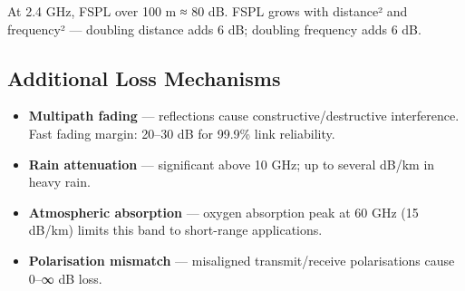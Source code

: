 At 2.4 GHz, FSPL over 100 m ≈ 80 dB. FSPL grows with distance² and frequency² — doubling distance adds 6 dB; doubling frequency adds 6 dB.

				

\subsection{Additional Loss Mechanisms}

				
\begin{itemize}

					\item \textbf{Multipath fading} — reflections cause constructive/destructive interference. Fast fading margin: 20–30 dB for 99.9\% link reliability.

					\item \textbf{Rain attenuation} — significant above 10 GHz; up to several dB/km in heavy rain.

					\item \textbf{Atmospheric absorption} — oxygen absorption peak at 60 GHz (15 dB/km) limits this band to short-range applications.

					\item \textbf{Polarisation mismatch} — misaligned transmit/receive polarisations cause 0–∞ dB loss.

				
\end{itemize}



